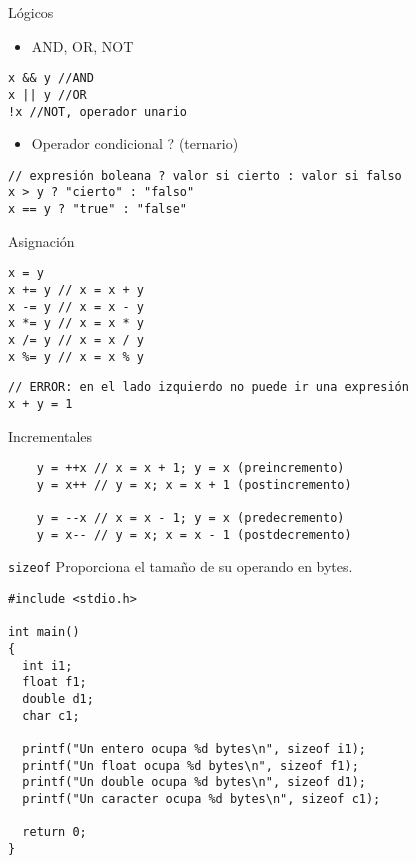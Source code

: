 \documentclass[xcolor={usenames,svgnames,dvipsnames}, aspectratio=169]{beamer}
\begin{document}
\begin{frame}[label={sec:org1d01f8b},fragile]{Lógicos}
 \begin{itemize}
\item AND, OR, NOT
\end{itemize}
\lstset{language=C,label= ,caption= ,captionpos=b,numbers=none}
\begin{lstlisting}
x && y //AND
x || y //OR
!x //NOT, operador unario
\end{lstlisting}

\begin{itemize}
\item Operador condicional ? (ternario)
\end{itemize}
\lstset{language=C,label= ,caption= ,captionpos=b,numbers=none}
\begin{lstlisting}
// expresión boleana ? valor si cierto : valor si falso
x > y ? "cierto" : "falso"
x == y ? "true" : "false"
\end{lstlisting}
\end{frame}

\begin{frame}[label={sec:org5d1b6a5},fragile]{Asignación}
 \lstset{language=C,label= ,caption= ,captionpos=b,numbers=none}
\begin{lstlisting}
x = y
x += y // x = x + y
x -= y // x = x - y
x *= y // x = x * y
x /= y // x = x / y
x %= y // x = x % y
\end{lstlisting}

\lstset{language=C,label= ,caption= ,captionpos=b,numbers=none}
\begin{lstlisting}
// ERROR: en el lado izquierdo no puede ir una expresión
x + y = 1
\end{lstlisting}
\end{frame}

\begin{frame}[label={sec:org169cebd},fragile]{Incrementales}
 \lstset{language=C,label= ,caption= ,captionpos=b,numbers=none}
\begin{lstlisting}
    y = ++x // x = x + 1; y = x (preincremento)
    y = x++ // y = x; x = x + 1 (postincremento)

    y = --x // x = x - 1; y = x (predecremento)
    y = x-- // y = x; x = x - 1 (postdecremento)
\end{lstlisting}
\end{frame}
\begin{frame}[label={sec:orgb658c39},fragile]{\texttt{sizeof}}
 Proporciona el tamaño de su operando en bytes.

\lstset{language=C,label= ,caption= ,captionpos=b,numbers=none}
\begin{lstlisting}
#include <stdio.h>

int main()
{
  int i1;
  float f1;
  double d1;
  char c1;

  printf("Un entero ocupa %d bytes\n", sizeof i1);
  printf("Un float ocupa %d bytes\n", sizeof f1);
  printf("Un double ocupa %d bytes\n", sizeof d1);
  printf("Un caracter ocupa %d bytes\n", sizeof c1);

  return 0;
}
\end{lstlisting}
\end{frame}
\end{document}
